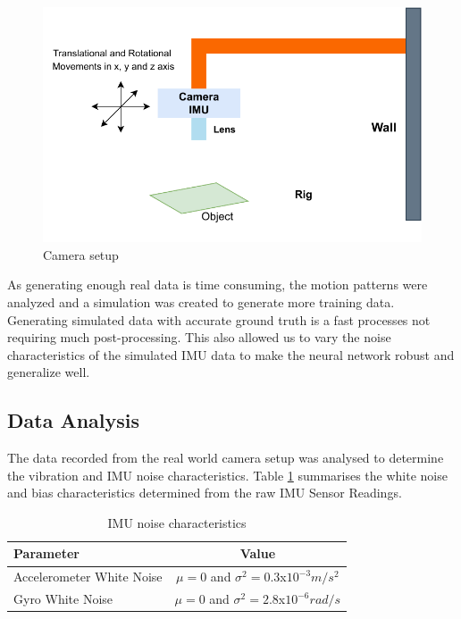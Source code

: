 \begin{figure}[H]
    \centering
    \includegraphics[scale=0.8]{images/fig_chapter4/camera_rig.pdf}
    \caption{Camera setup}
    \label{fig:camera_rig}
\end{figure}

As generating enough real data is time consuming, the motion patterns were analyzed and a simulation was created to generate more training data. Generating simulated data with accurate ground truth is a fast processes not requiring much post-processing. This also allowed us to vary the noise characteristics of the simulated IMU data to make the neural network robust and generalize well.

\subsection{Data Analysis}
\label{sec:data_analysis}
The data recorded from the real world camera setup was analysed to determine the vibration and IMU noise characteristics. Table \ref{tab:imu_noise_characteristics} summarises the white noise and bias characteristics determined from the raw IMU Sensor Readings. 


\begin{table}[H]
\centering
\begin{tabular}{| l|c |}
    \hline
    
    \textbf{Parameter} & \textbf{Value} \\ \hline
    Accelerometer White Noise & $ \mu = 0 $ and $ \sigma^{2}=0.3$x$10^{-3} m/s^{2}$  \\  
    Gyro White Noise & $ \mu = 0 $ and $ \sigma^{2}=2.8$x$10^{-6} rad/s$ \\

    \hline
    
\end{tabular}
\caption{IMU noise characteristics}
\label{tab:imu_noise_characteristics}
\end{table}


